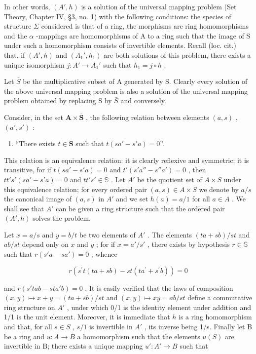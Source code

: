 In other words, \((A', h)\) is a solution of the universal mapping problem (Set Theory, Chapter IV, §3, no. 1) with the following conditions: the species of structure \(\Sigma\) considered is that of a ring, the morphisms are ring homomorphisms and the \(\alpha\) -mappings are homomorphisms of A to a ring such that the image of S under such a homomorphism consists of invertible elements. Recall (loc. cit.) that, if \((A', h)\) and \((A_{1}', h_{1})\) are both solutions of this problem, there exists a unique isomorphism \(j: A' \to A_{1}'\) such that \(h_{1} = j \circ h\) .

Let \(\bar{S}\) be the multiplicative subset of A generated by S. Clearly every solution of the above universal mapping problem is also a solution of the universal mapping problem obtained by replacing S by \(\bar{S}\) and conversely.

Consider, in the set \(\mathbf{A} \times \overline{\mathbf{S}}\) , the following relation between elements \((a, s)\) , \((a', s')\) :

\begin{enumerate}
\def\labelenumi{(\arabic{enumi})}
\tightlist
\item
 ``There exists \(t \in \overline{\mathbf{S}}\) such that \(t(sa' - s'a) = 0\)''.
\end{enumerate}

This relation is an equivalence relation: it is clearly reflexive and symmetric; it is transitive, for if \(t(sa' - s'a) = 0\) and \(t'(s'a'' - s''a') = 0\) , then \(tt's'(sa' - s'a) = 0\) and \(tt's' \in \overline{\mathbb{S}}\) . Let \(A'\) be the quotient set of \(A \times \overline{S}\) under this equivalence relation; for every ordered pair \((a, s) \in A \times \overline{S}\) we denote by \(a/s\) the canonical image of \((a, s)\) in \(A'\) and we set \(h(a) = a/1\) for all \(a \in A\) . We shall see that \(A'\) can be given a ring structure such that the ordered pair \((A', h)\) solves the problem.

Let \(x = a / s\) and \(y = b / t\) be two elements of \(A'\) . The elements \((ta + sb) / st\) and \(ab / st\) depend only on \(x\) and \(y\) ; for if \(x = a' / s'\) , there exists by hypothesis \(r \in \overline{\mathbb{S}}\) such that \(r(s'a - sa') = 0\) , whence

\[
r \left(s ^ {\prime} t (t a + s b) - s t \left(t a ^ {\prime} + s ^ {\prime} b\right)\right) = 0
\]

and \(r(s'tab - sta'b) = 0\) . It is easily verified that the laws of composition \((x,y) \mapsto x + y = (ta + sb)/st\) and \((x,y) \mapsto xy = ab/st\) define a commutative ring structure on \(A'\) , under which 0/1 is the identity element under addition and 1/1 is the unit element. Moreover, it is immediate that \(h\) is a ring homomorphism and that, for all \(s \in S\) , \(s/1\) is invertible in \(A'\) , its inverse being 1/s. Finally let B be a ring and \(u: A \to B\) a homomorphism such that the elements \(u(S)\) are invertible in B; there exists a unique mapping \(u': A' \to B\) such that

